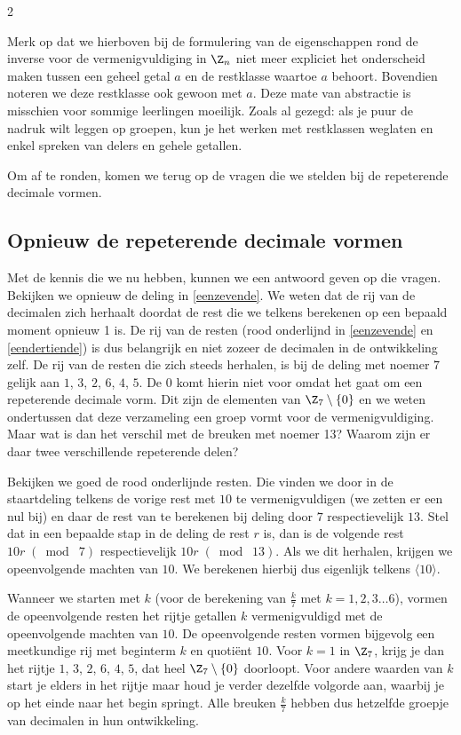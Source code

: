 	\begin{multicols}{2}

Merk op dat we hierboven bij de formulering van de eigenschappen rond de inverse voor de vermenigvuldiging in $\Z_n$ niet meer expliciet het onderscheid maken tussen een geheel getal $a$ en de restklasse waartoe $a$ behoort. Bovendien noteren we deze restklasse ook gewoon met $a$. Deze mate van abstractie is misschien voor sommige leerlingen moeilijk. Zoals al gezegd: als je puur de nadruk wilt leggen op groepen, kun je het werken met restklassen weglaten en enkel spreken van delers en gehele getallen.
		
	
Om af te ronden, komen we terug op de vragen die we stelden bij de repeterende decimale vormen.
\subsection{Opnieuw de repeterende decimale vormen}

Met de kennis die we nu hebben, kunnen we een antwoord geven op die vragen. Bekijken we opnieuw de deling in \autoref{eenzevende}. We weten dat de rij van de decimalen zich herhaalt doordat de rest die we telkens berekenen op een bepaald moment opnieuw 1 is. De rij van de resten (rood onderlijnd in \autoref{eenzevende} en \autoref{eendertiende}) is dus belangrijk en niet zozeer de decimalen in de ontwikkeling zelf. De rij van de resten die zich steeds herhalen, is bij de deling met noemer $7$ gelijk aan $1$, $3$, $2$, $6$, $4$, $5$. De $0$ komt hierin niet voor omdat het gaat om een repeterende decimale vorm. Dit zijn de elementen van $\Z_7\setminus \{0\}$ en we weten ondertussen dat deze verzameling een groep vormt voor de vermenigvuldiging. Maar wat is dan het verschil met de breuken met noemer 13? Waarom zijn er daar twee verschillende repeterende delen?

Bekijken we goed de rood onderlijnde resten. Die vinden we door in de staartdeling telkens de vorige rest met $10$ te vermenigvuldigen (we zetten er een nul bij) en daar de rest van te berekenen bij deling door $7$ respectievelijk $13$. Stel dat in een bepaalde stap in de deling de rest $r$ is, dan is de volgende rest $10r \;(\bmod\; 7)$ respectievelijk $10r \;(\bmod\; 13)$. Als we dit herhalen, krijgen we opeenvolgende machten van $10$. We berekenen hierbij dus eigenlijk telkens $\langle 10\rangle$.  

Wanneer we starten met $k$ (voor de berekening van $\frac{k}{7}$ met $k=1, 2, 3 \ldots 6$), vormen de opeenvolgende resten het rijtje getallen $k$ vermenigvuldigd met de opeenvolgende machten van $10$. De opeenvolgende resten vormen bijgevolg een meetkundige rij met beginterm $k$ en quotiënt $10$.
Voor $k=1$ in $\Z_7$, krijg je dan het rijtje $1$, $3$, $2$, $6$, $4$, $5$, dat heel $\Z_7\setminus \{0\}$ doorloopt. Voor andere waarden van $k$ start je elders in het rijtje maar houd je verder dezelfde volgorde aan, waarbij je op het einde naar het begin springt. Alle breuken  $\frac{k}{7}$ hebben dus hetzelfde groepje van decimalen in hun ontwikkeling. 




\end{multicols}
